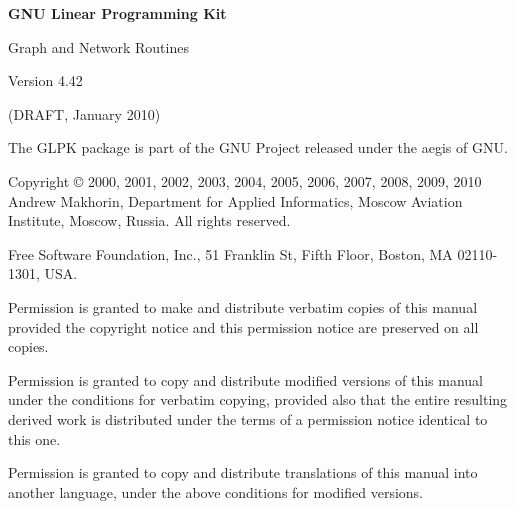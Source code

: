 \documentclass[dvipdfm,11pt]{report}
\begin{document}
\thispagestyle{empty}

\begin{center}

\vspace*{1in}

\begin{huge}
\sf\bfseries GNU Linear Programming Kit
\end{huge}

\vspace{0.5in}

\begin{LARGE}
\sf Graph and Network Routines
\end{LARGE}

\vspace{0.5in}

\begin{LARGE}
\sf Version 4.42
\end{LARGE}

\vspace{0.5in}
\begin{Large}
\sf (DRAFT, January 2010)
\end{Large}
\end{center}

\newpage

\vspace*{1in}

\vfill

\noindent
The GLPK package is part of the GNU Project released under the aegis of
GNU.

\medskip \noindent
Copyright \copyright{} 2000, 2001, 2002, 2003, 2004, 2005, 2006, 2007,
2008, 2009, 2010 Andrew Makhorin, Department for Applied Informatics,
Moscow Aviation Institute, Moscow, Russia. All rights reserved.

\medskip \noindent
Free Software Foundation, Inc., 51 Franklin St, Fifth Floor, Boston, MA
02110-1301, USA.

\medskip \noindent
Permission is granted to make and distribute verbatim copies of this
manual provided the copyright notice and this permission notice are
preserved on all copies.

\medskip \noindent
Permission is granted to copy and distribute modified versions of this
manual under the conditions for verbatim copying, provided also that the
entire resulting derived work is distributed under the terms of
a permission notice identical to this one.

\medskip \noindent
Permission is granted to copy and distribute translations of this manual
into another language, under the above conditions for modified versions.
\end{document}
